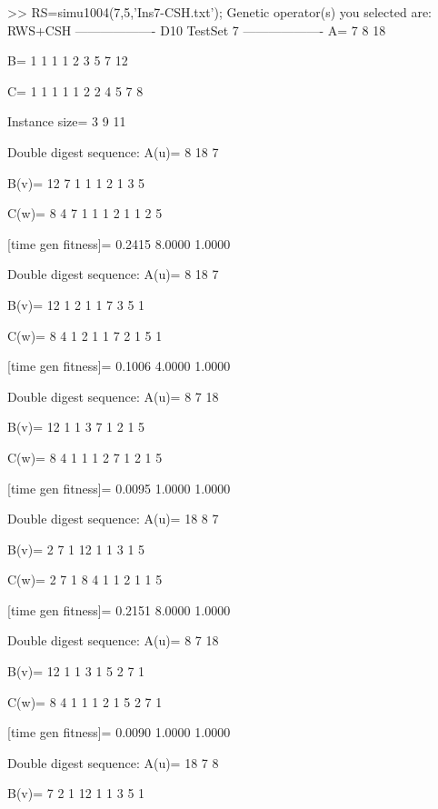 >> RS=simu1004(7,5,'Ins7-CSH.txt');
Genetic operator(s) you selected are:
RWS+CSH
------------------- D10 TestSet 7 -------------------
A=
     7     8    18

B=
     1     1     1     1     2     3     5     7    12

C=
     1     1     1     1     1     2     2     4     5     7     8

Instance size=
     3     9    11

Double digest sequence:
A(u)=
     8    18     7

B(v)=
    12     7     1     1     1     2     1     3     5

C(w)=
     8     4     7     1     1     1     2     1     1     2     5

[time gen fitness]=
    0.2415    8.0000    1.0000

Double digest sequence:
A(u)=
     8    18     7

B(v)=
    12     1     2     1     1     7     3     5     1

C(w)=
     8     4     1     2     1     1     7     2     1     5     1

[time gen fitness]=
    0.1006    4.0000    1.0000

Double digest sequence:
A(u)=
     8     7    18

B(v)=
    12     1     1     3     7     1     2     1     5

C(w)=
     8     4     1     1     1     2     7     1     2     1     5

[time gen fitness]=
    0.0095    1.0000    1.0000

Double digest sequence:
A(u)=
    18     8     7

B(v)=
     2     7     1    12     1     1     3     1     5

C(w)=
     2     7     1     8     4     1     1     2     1     1     5

[time gen fitness]=
    0.2151    8.0000    1.0000

Double digest sequence:
A(u)=
     8     7    18

B(v)=
    12     1     1     3     1     5     2     7     1

C(w)=
     8     4     1     1     1     2     1     5     2     7     1

[time gen fitness]=
    0.0090    1.0000    1.0000

Double digest sequence:
A(u)=
    18     7     8

B(v)=
     7     2     1    12     1     1     3     5     1

